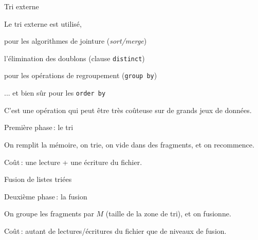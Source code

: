 
\begin{frame}{Tri externe}

Le \alert{tri externe} est utilisé,

\begin{redbullet}
  \item pour les algorithmes de jointure (\textit{sort/merge})

   \item l'élimination des doublons (clause \texttt{distinct})

    \item pour les opérations de regroupement (\texttt{group by})

   \item ... et bien sûr pour les \texttt{order by}
\end{redbullet}

C'est une opération qui peut être très coûteuse
sur de grands jeux de données.
\end{frame}
\begin{frame}{Première phase\,: le tri}

On remplit la mémoire, on trie, on vide
dans des \alert{fragments}, et
on recommence.

\medskip


\medskip

Coût\,: une lecture + une écriture du fichier.

\end{frame}
\begin{frame}{Fusion de listes triées}


\end{frame}

\begin{frame}{Deuxième phase\,: la fusion}

On groupe les fragments par $M$ (taille de la zone
de tri), et on fusionne.

\medskip



\medskip

Coût\,: autant de lectures/écritures du fichier que de niveaux
de fusion.

\end{frame}

